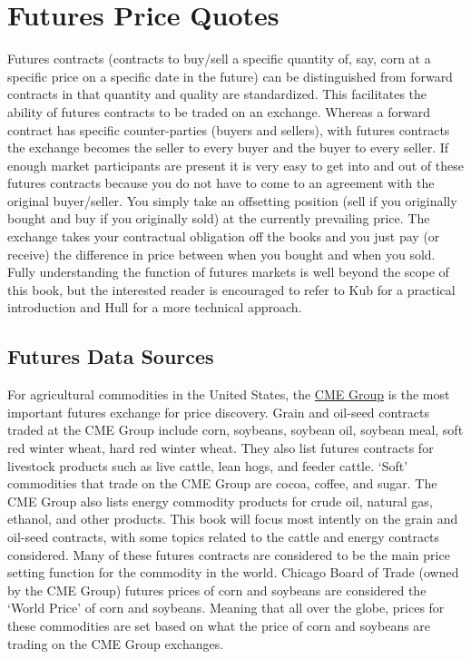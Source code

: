 \documentclass[]{book}
\theoremstyle{definition}
\theoremstyle{definition}
\theoremstyle{remark}
\begin{document}
\section{Futures Price Quotes}\label{futures-price-quotes}

Futures contracts (contracts to buy/sell a specific quantity of, say,
corn at a specific price on a specific date in the future) can be
distinguished from forward contracts in that quantity and quality are
standardized. This facilitates the ability of futures contracts to be
traded on an exchange. Whereas a forward contract has specific
counter-parties (buyers and sellers), with futures contracts the
exchange becomes the seller to every buyer and the buyer to every
seller. If enough market participants are present it is very easy to get
into and out of these futures contracts because you do not have to come
to an agreement with the original buyer/seller. You simply take an
offsetting position (sell if you originally bought and buy if you
originally sold) at the currently prevailing price. The exchange takes
your contractual obligation off the books and you just pay (or receive)
the difference in price between when you bought and when you sold. Fully
understanding the function of futures markets is well beyond the scope
of this book, but the interested reader is encouraged to refer to Kub
\citeyearpar{kub2012Mastering} for a practical introduction and Hull
\citep{hull1991introduction} for a more technical approach.

\subsection{Futures Data Sources}\label{futures-data-sources}

For agricultural commodities in the United States, the
\href{http://www.cmegroup.com/}{CME Group} is the most important futures
exchange for price discovery. Grain and oil-seed contracts traded at the
CME Group include corn, soybeans, soybean oil, soybean meal, soft red
winter wheat, hard red winter wheat. They also list futures contracts
for livestock products such as live cattle, lean hogs, and feeder
cattle. `Soft' commodities that trade on the CME Group are cocoa,
coffee, and sugar. The CME Group also lists energy commodity products
for crude oil, natural gas, ethanol, and other products. This book will
focus most intently on the grain and oil-seed contracts, with some
topics related to the cattle and energy contracts considered. Many of
these futures contracts are considered to be the main price setting
function for the commodity in the world. Chicago Board of Trade (owned
by the CME Group) futures prices of corn and soybeans are considered the
`World Price' of corn and soybeans. Meaning that all over the globe,
prices for these commodities are set based on what the price of corn and
soybeans are trading on the CME Group exchanges.
\end{document}
